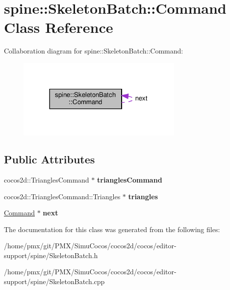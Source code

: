 \hypertarget{classspine_1_1SkeletonBatch_1_1Command}{}\section{spine\+:\+:Skeleton\+Batch\+:\+:Command Class Reference}
\label{classspine_1_1SkeletonBatch_1_1Command}


Collaboration diagram for spine\+:\+:Skeleton\+Batch\+:\+:Command\+:
\nopagebreak
\begin{figure}[H]
\begin{center}
\leavevmode
\includegraphics[width=230pt]{classspine_1_1SkeletonBatch_1_1Command__coll__graph}
\end{center}
\end{figure}
\subsection*{Public Attributes}
\begin{DoxyCompactItemize}
\item 
\mbox{\label{classspine_1_1SkeletonBatch_1_1Command_aaf55144e1b9db5e9ec3b53ad2dd4a4cc}} 
cocos2d\+::\+Triangles\+Command $\ast$ {\bfseries triangles\+Command}
\item 
\mbox{\label{classspine_1_1SkeletonBatch_1_1Command_abcde62c47290b6310e0f8dd28d86b630}} 
cocos2d\+::\+Triangles\+Command\+::\+Triangles $\ast$ {\bfseries triangles}
\item 
\mbox{\label{classspine_1_1SkeletonBatch_1_1Command_a2515a12a048c01567da053e370e6beb9}} 
\hyperlink{classspine_1_1SkeletonBatch_1_1Command}{Command} $\ast$ {\bfseries next}
\end{DoxyCompactItemize}


The documentation for this class was generated from the following files\+:\begin{DoxyCompactItemize}
\item 
/home/pmx/git/\+P\+M\+X/\+Simu\+Cocos/cocos2d/cocos/editor-\/support/spine/Skeleton\+Batch.\+h\item 
/home/pmx/git/\+P\+M\+X/\+Simu\+Cocos/cocos2d/cocos/editor-\/support/spine/Skeleton\+Batch.\+cpp\end{DoxyCompactItemize}
